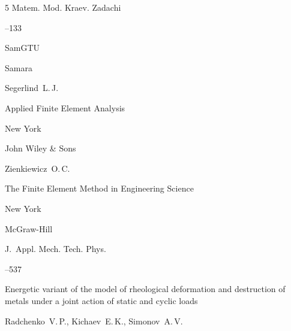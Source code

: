 \begin{thebibliography}{5}
\serial Matem. Mod. Kraev. Zadachi


--133

\publ SamGTU

\publaddr Samara






\by Segerlind~L.\,J.

\book Applied Finite Element Analysis 

\publaddr New York

\publ John Wiley \& Sons






\by Zienkiewicz~O.\,C.

\book The Finite Element Method in Engineering Science

\publaddr New York

\publ McGraw-Hill

















\jour J.~Appl. Mech. Tech. Phys.




--537


\paper Energetic variant of the model of rheological deformation and destruction of metals under a joint action of static and cyclic loads

\by Radchenko~V.\,P., Kichaev~E.\,K., Simonov~A.\,V.





\end{thebibliography}
